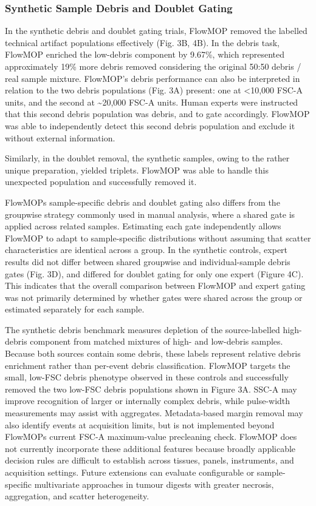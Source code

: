 \documentclass[ASNA]{latex/wiley/USG}
\begin{document}
\subsubsection{Synthetic Sample Debris and Doublet
Gating}\label{synthetic-sample-debris-and-doublet-gating}

In the synthetic debris and doublet gating trials, FlowMOP removed the
labelled technical artifact populations effectively (Fig. 3B, 4B). In
the debris task, FlowMOP enriched the low-debris component by 9.67\%,
which represented approximately 19\% more debris removed considering the
original 50:50 debris / real sample mixture. FlowMOP's debris
performance can also be interpreted in relation to the two debris
populations (Fig. 3A) present: one at \textless10,000 FSC-A units, and
the second at \textasciitilde20,000 FSC-A units. Human experts were
instructed that this second debris population was debris, and to gate
accordingly. FlowMOP was able to independently detect this second debris
population and exclude it without external information.

Similarly, in the doublet removal, the synthetic samples, owing to the
rather unique preparation, yielded triplets. FlowMOP was able to handle
this unexpected population and successfully removed it.

FlowMOP\textquotesingle s sample-specific debris and doublet gating also
differs from the groupwise strategy commonly used in manual analysis,
where a shared gate is applied across related samples. Estimating each
gate independently allows FlowMOP to adapt to sample-specific
distributions without assuming that scatter characteristics are
identical across a group. In the synthetic controls, expert results did
not differ between shared groupwise and individual-sample debris gates
(Fig. 3D), and differed for doublet gating for only one expert (Figure
4C). This indicates that the overall comparison between FlowMOP and
expert gating was not primarily determined by whether gates were shared
across the group or estimated separately for each sample.

The synthetic debris benchmark measures depletion of the source-labelled
high-debris component from matched mixtures of high- and low-debris
samples. Because both sources contain some debris, these labels
represent relative debris enrichment rather than per-event debris
classification. FlowMOP targets the small, low-FSC debris phenotype
observed in these controls and successfully removed the two low-FSC
debris populations shown in Figure 3A. SSC-A may improve recognition of
larger or internally complex debris, while pulse-width measurements may
assist with aggregates. Metadata-based margin removal may also identify
events at acquisition limits, but is not implemented beyond
FlowMOP\textquotesingle s current FSC-A maximum-value precleaning check.
FlowMOP does not currently incorporate these additional features because
broadly applicable decision rules are difficult to establish across
tissues, panels, instruments, and acquisition settings. Future
extensions can evaluate configurable or sample-specific multivariate
approaches in tumour digests with greater necrosis, aggregation, and
scatter heterogeneity.
\end{document}
